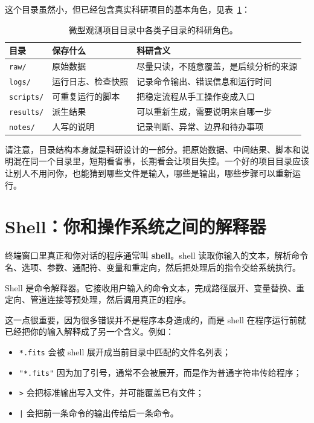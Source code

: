 这个目录虽然小，但已经包含真实科研项目的基本角色，见表~\ref{tab:ch01_project_dirs}：

\begin{table}[htbp]
\centering
\begin{tabular}{p{}p{}p{}}
\toprule
目录 & 保存什么 & 科研含义 \\
\midrule
\texttt{raw/} & 原始数据 & 尽量只读，不随意覆盖，是后续分析的来源 \\
\texttt{logs/} & 运行日志、检查快照 & 记录命令输出、错误信息和运行时间 \\
\texttt{scripts/} & 可重复运行的脚本 & 把稳定流程从手工操作变成入口 \\
\texttt{results/} & 派生结果 & 可以重新生成，需要说明来自哪一步 \\
\texttt{notes/} & 人写的说明 & 记录判断、异常、边界和待办事项 \\
\bottomrule
\end{tabular}
\caption{微型观测项目目录中各类子目录的科研角色。}
\label{tab:ch01_project_dirs}
\end{table}

请注意，目录结构本身就是科研设计的一部分。把原始数据、中间结果、脚本和说明混在同一个目录里，短期看省事，长期看会让项目失控。一个好的项目目录应该让别人不用问你，也能猜到哪些文件是输入，哪些是输出，哪些步骤可以重新运行。

\section{Shell：你和操作系统之间的解释器}

终端窗口里真正和你对话的程序通常叫 \textbf{shell}。shell 读取你输入的文本，解析命令名、选项、参数、通配符、变量和重定向，然后把处理后的指令交给系统执行。

\begin{defbox}[Shell]
Shell 是命令解释器。它接收用户输入的命令文本，完成路径展开、变量替换、重定向、管道连接等预处理，然后调用真正的程序。
\end{defbox}

这一点很重要，因为很多错误并不是程序本身造成的，而是 shell 在程序运行前就已经把你的输入解释成了另一个含义。例如：

\begin{itemize}
    \item \texttt{*.fits} 会被 shell 展开成当前目录中匹配的文件名列表；
    \item \texttt{"*.fits"} 因为加了引号，通常不会被展开，而是作为普通字符串传给程序；
    \item \texttt{>} 会把标准输出写入文件，并可能覆盖已有文件；
    \item \texttt{|} 会把前一条命令的输出传给后一条命令。
\end{itemize}


